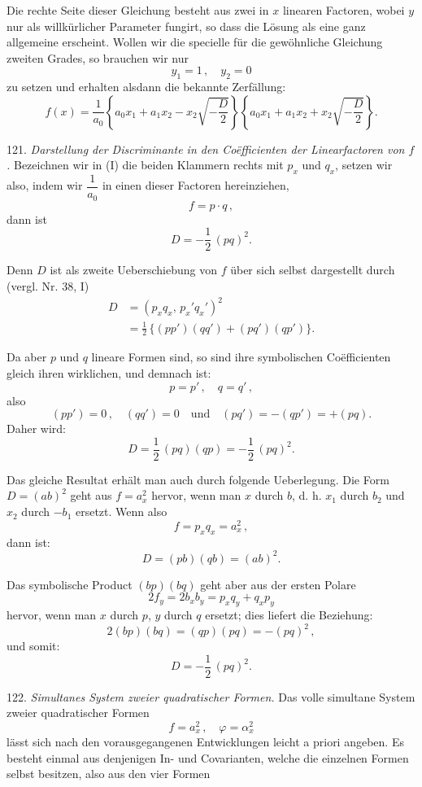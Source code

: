 \documentclass[11pt]{article}
\providecommand{\weberpage}[1]{}
\providecommand{\weq}[2]{\begin{equation}\tag{#1}#2\end{equation}}
\begin{document}
Die rechte Seite dieser Gleichung besteht aus zwei in $x$ linearen Factoren, wobei $y$ nur als willkürlicher Parameter fungirt, so dass die Lösung als eine ganz allgemeine erscheint. Wollen wir die specielle für die gewöhnliche Gleichung zweiten Grades, so brauchen wir nur
\[
y_1 = 1\,, \quad y_2 = 0
\]
zu setzen und erhalten alsdann die bekannte Zerfällung:
\weq{I}{f(x) = \frac{1}{a_0}\left\{a_0 x_1 + a_1 x_2 - x_2\sqrt{-\frac{D}{2}}\right\}\left\{a_0 x_1 + a_1 x_2 + x_2\sqrt{-\frac{D}{2}}\right\}.}


\weberpage{138}
121. \textit{Darstellung der Discriminante in den Co\"efficienten der Linearfactoren von $f$.} Bezeichnen wir in (I) die beiden Klammern rechts mit $p_x$ und $q_x$, setzen wir also, indem wir $\dfrac{1}{a_0}$ in einen dieser Factoren hereinziehen,
\[
f = p\cdot q\,,
\]
dann ist
\[
D = -\frac{1}{2}\,(pq)^2.
\]

Denn $D$ ist als zweite Ueberschiebung von $f$ über sich selbst dargestellt durch (vergl. Nr. 38, I)
\[
\begin{aligned}
D &= (p_x q_x,\, p_x' q_x')^2 \\
&= \frac{1}{2}\,\{(pp')(qq') + (pq')(qp')\}.
\end{aligned}
\]

Da aber $p$ und $q$ lineare Formen sind, so sind ihre symbolischen Co\"efficienten gleich ihren wirklichen, und demnach ist:
\[
p = p'\,, \quad q = q'\,,
\]
also
\[
(pp') = 0\,, \quad (qq') = 0 \quad \text{und} \quad (pq') = -(qp') = +(pq).
\]
Daher wird:
\[
D = \frac{1}{2}\,(pq)(qp) = -\frac{1}{2}\,(pq)^2.
\]

Das gleiche Resultat erhält man auch durch folgende Ueberlegung. Die Form $D=(ab)^2$ geht aus $f=a_x^2$ hervor, wenn man $x$ durch $b$, d. h. $x_1$ durch $b_2$ und $x_2$ durch $-b_1$ ersetzt. Wenn also
\[
f = p_x q_x = a_x^2\,,
\]
dann ist:
\[
D = (pb)(qb) = (ab)^2.
\]

Das symbolische Product $(bp)(bq)$ geht aber aus der ersten Polare
\[
2f_y = 2b_x b_y = p_x q_y + q_x p_y
\]
hervor, wenn man $x$ durch $p$, $y$ durch $q$ ersetzt; dies liefert die Beziehung:
\[
2(bp)(bq) = (qp)(pq) = -(pq)^2\,,
\]
und somit:
\[
D = -\frac{1}{2}\,(pq)^2.
\]

122. \textit{Simultanes System zweier quadratischer Formen.} Das volle simultane System zweier quadratischer Formen
\[
f = a_x^2\,, \quad \varphi = \alpha_x^2
\]
lässt sich nach den vorausgegangenen Entwicklungen leicht a priori angeben. Es besteht einmal aus denjenigen In- und Covarianten, welche die einzelnen Formen selbst besitzen, also aus den vier Formen
\end{document}
